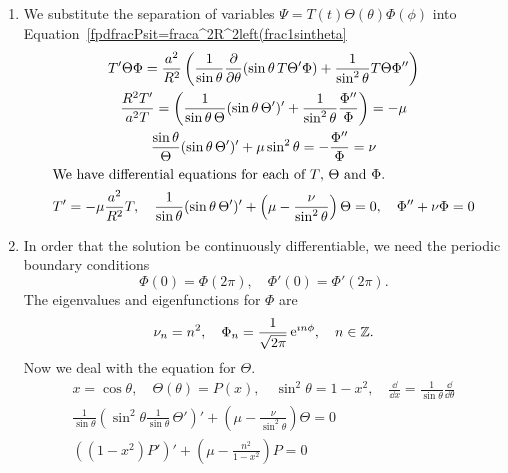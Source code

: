 {%
\begin{Solution}
  \label{solution diffusion spherical separation}
  \begin{enumerate}
  \item
    We substitute the separation of variables 
    $\Psi = T(t) \Theta(\theta) \Phi(\phi)$ into 
    Equation~\ref{fpdfracPsit=fraca^2R^2left(frac1sintheta}
    \begin{gather*}
      T' \Theta \Phi = \frac{a^2}{R^2} \left( 
        \frac{1}{\sin \theta} \frac{\partial}{\partial \theta} 
        ( \sin \theta\, T \Theta' \Phi )
        + \frac{1}{\sin^2 \theta} T \Theta \Phi'' \right) \\
      \frac{ R^2 T' }{ a^2 T } = \left( \frac{1}{\sin \theta\, \Theta } 
        ( \sin \theta\, \Theta' )'
        + \frac{1}{\sin^2 \theta} \frac{ \Phi'' }{\Phi} \right) 
      = - \mu \\
      \frac{\sin \theta}{\Theta } 
      ( \sin \theta\, \Theta' )'
      + \mu \sin^2 \theta 
      = - \frac{ \Phi'' }{\Phi} = \nu \\
      \intertext{We have differential equations for each of $T$, $\Theta$
        and $\Phi$.}
      T' = - \mu \frac{a^2}{R^2} T, \quad
      \frac{1}{\sin \theta} ( \sin \theta\, \Theta' )'
      + \left(\mu - \frac{\nu}{\sin^2 \theta} \right) \Theta = 0, \quad
      \Phi'' + \nu \Phi = 0
    \end{gather*}
  \item
    In order that the solution be continuously differentiable, we need the
    periodic boundary conditions
    \[
    \Phi(0) = \Phi(2 \pi), \quad \Phi'(0) = \Phi'(2 \pi).
    \]
    The eigenvalues and eigenfunctions for $\Phi$ are
    \[
    \nu_n = n^2, \quad \Phi_n = \frac{1}{\sqrt{2 \pi}} \mathop{\mathrm{e}}\nolimits^{\imath n \phi},
    \quad n \in \mathbb{Z}.
    \]
    Now we deal with the equation for $\Theta$.
    \begin{gather*}
      x = \cos \theta, \quad \Theta(\theta) = P(x), \quad
      \sin^2 \theta = 1 - x^2, \quad
      \frac{\dd}{\dd x} = \frac{1}{\sin \theta} \frac{\dd}{\dd \theta} \\
      \frac{1}{\sin \theta} ( \sin^2 \theta \frac{1}{\sin \theta}\, \Theta' )'
      + \left(\mu - \frac{\nu}{\sin^2 \theta} \right) \Theta = 0 \\
      \left( \left( 1 - x^2 \right) P' \right)' 
      + \left(\mu - \frac{n^2}{1 - x^2} \right) P = 0
    \end{gather*}

\end{enumerate}
\end{Solution}}
